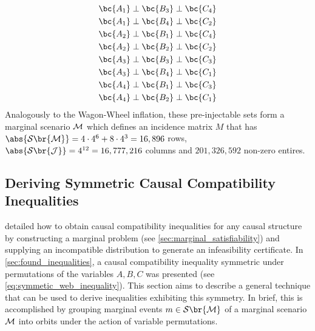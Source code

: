 \documentclass[aps, 10pt, english, twoside, pra, nofootinbib, tightenlines, longbibliography, superscriptaddress]{revtex4-1}
\renewcommand{\Events}[1]{\mathcal{S}\br{#1}} %
\begin{document}
\begin{equation*}
\begin{gathered}
            \bc{A_1} \ancestralindep \bc{B_3} \ancestralindep \bc{C_4} \\
            \bc{A_1} \ancestralindep \bc{B_4} \ancestralindep \bc{C_2} \\
            \bc{A_2} \ancestralindep \bc{B_1} \ancestralindep \bc{C_4} \\
            \bc{A_2} \ancestralindep \bc{B_2} \ancestralindep \bc{C_2} \\
            \bc{A_3} \ancestralindep \bc{B_3} \ancestralindep \bc{C_3} \\
            \bc{A_3} \ancestralindep \bc{B_4} \ancestralindep \bc{C_1} \\
            \bc{A_4} \ancestralindep \bc{B_1} \ancestralindep \bc{C_3} \\
            \bc{A_4} \ancestralindep \bc{B_2} \ancestralindep \bc{C_1}
        \end{gathered}
    \end{equation*}
    Analogously to the Wagon-Wheel inflation, these pre-injectable sets form a marginal scenario $\mathcal{M}$ which defines an incidence matrix $M$ that has $\abs{\Events{\mscenario}} = 4 \cdot 4^{6} + 8 \cdot 4^3 = 16,896$ rows, $\abs{\Events{\jointvar}} = 4^{12} = 16,777,216$ columns and $201,326,592$ non-zero entires.

    \subsection{Deriving Symmetric Causal Compatibility Inequalities}
    \label{sec:symmetric_inequalities}

     detailed how to obtain causal compatibility inequalities for any causal structure by constructing a marginal problem (see \cref{sec:marginal_satisfiability}) and supplying an incompatible distribution to generate an infeasibility certificate. In \cref{sec:found_inequalities}, a causal compatibility inequality symmetric under permutations of the variables $A,B,C$ was presented (see \cref{eq:symmetic_web_inequality}). This section aims to describe a general technique that can be used to derive inequalities exhibiting this symmetry. In brief, this is accomplished by grouping marginal events $m \in \Events{\mscenario}$ of a marginal scenario $\mathcal{M}$ into orbits under the action of variable permutations.
\end{document}

